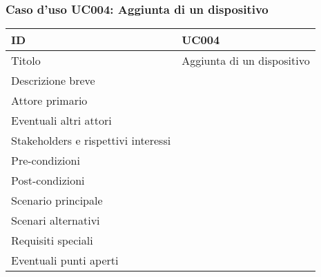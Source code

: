 \documentclass[../../main.tex]{subfiles}
\begin{document}
\subsubsection{Caso d’uso UC004: Aggiunta di un dispositivo }
\begin{tabularx}{150mm}{|l|X|}
    \hline
    ID                                  & \textbf{UC004}\\
    \hline
    Titolo                              & Aggiunta di un dispositivo \\
    \hline
    Descrizione breve                   &    \\
    \hline
    Attore primario                     &    \\
    \hline
    Eventuali altri attori              &    \\
    \hline
    Stakeholders e rispettivi interessi &    \\
    \hline
    Pre-condizioni                      &    \\
    \hline
    Post-condizioni                     &    \\
    \hline
    Scenario principale                 &    \\
    \hline
    Scenari alternativi                 &    \\
    \hline
    Requisiti speciali                  &    \\
    \hline
    Eventuali punti aperti              &    \\
    \hline
\end{tabularx}
\newpage
\end{document}
